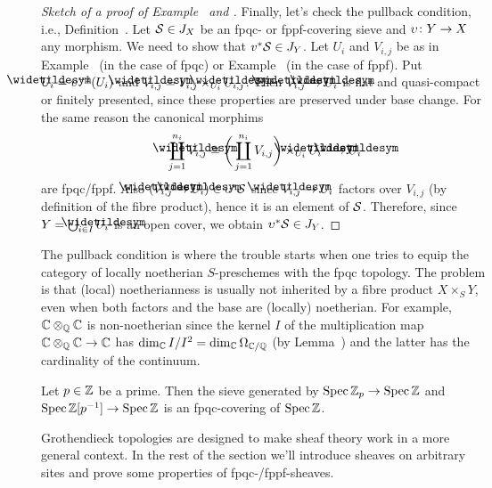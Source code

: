 \documentclass[a4paper,parskip=half,numbers=enddot, DIV=12]{scrreprt}
\begin{document}
\begin{proof}[Sketch of a proof of Example~ and ]
	Finally, let's check the pullback condition, i.e., Definition~. Let $\mathcal{S}\in J_X$ be an fpqc- or fppf-covering sieve and $\upsilon\colon Y\morphism X$ any morphism. We need to show that $v^*\mathcal{S}\in J_Y$. Let $U_i$ and $V_{i,j}$ be as in Example~ (in the case of fpqc) or Example~ (in the case of fppf). Put $\snake{U}_i=\upsilon^{-1}(U_i)$ and $\snake{V}_{i,j}=V_{i,j}\times_{U_i}\snake{U}_{i,j}$. Then $\snake{V}_{i,j}\morphism\snake{U}_i$ is flat and quasi-compact or finitely presented, since these properties are preserved under base change. For the same reason the canonical morphims
	\begin{align*}
		\coprod_{j=1}^{n_i}\snake{V}_{i,j}\cong \bigg(\coprod_{j=1}^{n_i}V_{i,j}\bigg)\times_{U_i}\snake{U}_i\morphism \snake{U}_i
	\end{align*}
	are fpqc/fppf. Also $(\snake{V}_{i,j}\morphism \snake{U}_i)\in\upsilon^*\Ss$ since $\snake{V}_{i,j}\morphism U_i$ factors over $V_{i,j}$ (by definition of the fibre product), hence it is an element of $\mathcal{S}$. Therefore, since $Y=\bigcup_{i\in I}\snake{U}_i$ is an open cover, we obtain $\upsilon^*\mathcal{S}\in J_Y$.
\end{proof}
\begin{rem}
	 The pullback condition is where the trouble starts when one tries to equip the category of locally noetherian $S$-preschemes with the fpqc topology. The problem is that (local) noetherianness is usually not inherited by a fibre product $X\times_SY$, even when both factors and the base are (locally) noetherian. For example, $\mathbb{C}\otimes_{\mathbb{Q}}\mathbb{C}$ is non-noetherian since the kernel $I$ of the multiplication map $\IC\otimes_\IQ\IC\morphism\IC$ has $\dim_{\mathbb{C}} I/I^2=\dim_{\mathbb{C}}\Omega_{\mathbb{C}/\mathbb{Q}}$ (by Lemma~) and the latter has the cardinality of the continuum.
\end{rem}
\begin{example}
	Let $p\in\mathbb{Z}$ be a prime. Then the sieve generated by $\Spec \IZ_p\morphism\Spec\IZ$ and $\Spec\IZ[p^{-1}]\morphism\Spec \IZ$ is an fpqc-covering of $\operatorname{Spec} \mathbb{Z}$.
\end{example}
Grothendieck topologies are designed to make sheaf theory work in a more general context. In the rest of the section we'll introduce sheaves on arbitrary sites and prove some properties of fpqc-/fppf-sheaves.
\end{document}
